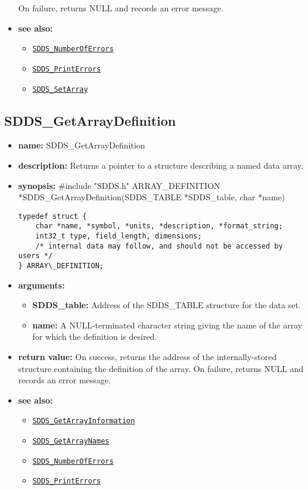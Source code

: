 \documentclass[11pt]{article}
\newcommand{\progref}[1]{\hyperref[SDDS_#1]{\tt SDDS\_#1}}
\begin{document}
\begin{itemize}
\newline
On failure, returns NULL and records an error message. 
\item {\bf see also:}
\begin{itemize}
\item \progref{NumberOfErrors}
\item \progref{PrintErrors}
\item \progref{SetArray}
\end{itemize}
\end{itemize}

\subsection{SDDS\_GetArrayDefinition}
\label{SDDS_GetArrayDefinition}

\begin{itemize}
\item {\bf name:}\newline
SDDS\_GetArrayDefinition
\item {\bf description:}\newline
Returns a pointer to a structure describing a named data array.
\item {\bf synopsis:} \#include "SDDS.h"\newline
ARRAY\_DEFINITION *SDDS\_GetArrayDefinition(SDDS\_TABLE *SDDS\_table, char *name)\newline
\begin{verbatim}
typedef struct {
    char *name, *symbol, *units, *description, *format_string;
    int32_t type, field_length, dimensions;
    /* internal data may follow, and should not be accessed by users */
} ARRAY\_DEFINITION;
\end{verbatim}
\item {\bf arguments:}
\begin{itemize}
\item {\bf SDDS\_table:} Address of the SDDS\_TABLE structure for the data set.
\item {\bf name:} A NULL-terminated character string giving the name of the array for which the definition is desired.
\end{itemize}
\item {\bf return value:}\newline
On success, returns the address of the internally-stored structure containing the definition of the array. On failure, returns NULL and records an error message.
\item {\bf see also:}
\begin{itemize}
\item \progref{GetArrayInformation}
\item \progref{GetArrayNames}
\item \progref{NumberOfErrors}
\item \progref{PrintErrors}
\end{itemize}
\end{itemize}
\end{document}
